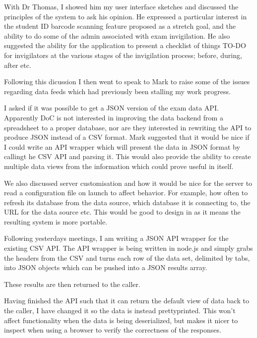 \documentclass[idxtotoc,hyperref,openany]{labbook} %
\begin{document}
 With Dr Thomas, I showed him my user interface sketches and discussed the principles of the system to ask his opinion.  He expressed a particular interest in the student ID barcode scanning feature proposed as a stretch goal, and the ability to do some of the admin associated with exam invigilation.  He also suggested the ability for the application to present a checklist of things TO-DO for invigilators at the various stages of the invigilation process; before, during, after etc.

 Following this dicussion I then went to speak to Mark to raise some of the issues regarding data feeds which had previously been stalling my work progress.

 I asked if it was possible to get a JSON version of the exam data API.  Apparently DoC is not interested in improving the data backend from a spreadsheet to a proper database, nor are they interested in rewriting the API to produce JSON instead of a CSV format.  Mark suggested that it would be nice if I could write an API wrapper which will present the data in JSON format by callingt he CSV API and parsing it.  This would also provide the ability to create multiple data views from the information which could prove useful in itself.

 We also discussed server customisation and how it would be nice for the server to read a configuration file on launch to affect behavior.  For example, how often to refresh its database from the data source, which database it is connecting to, the URL for the data source etc.  This would be good to design in as it means the resulting system is more portable.




 Following yesterdays meetings, I am writing a JSON API wrapper for the existing CSV API.  The API wrapper is being written in node.js and simply grabs the headers from the CSV and turns each row of the data set, delimited by tabs, into JSON objects which can be pushed into a JSON results array.

 These results are then returned to the caller.

 Having finished the API such that it can return the default view of data back to the caller, I have changed it so the data is instead prettyprinted.  This won't affect functionality when the data is being deserialized, but makes it nicer to inspect when using a browser to verify the correctness of the responses.
\end{document}
